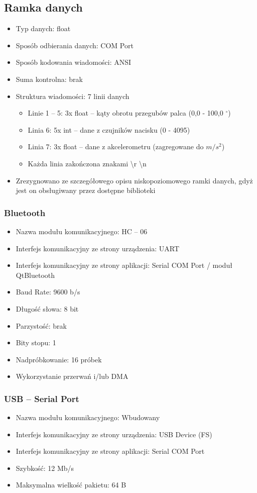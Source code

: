 \documentclass[10pt,a4paper]{article}
\begin{document}
\subsection{Ramka danych}
\begin{itemize}
\item Typ danych: float
\item Sposób odbierania danych: COM Port
\item Sposób kodowania wiadomości: ANSI
\item Suma kontrolna: brak
\item Struktura wiadomości: 7 linii danych
\begin{itemize}
\item Linie 1 -- 5: 3x float -- kąty obrotu przegubów palca (0,0 - 100,0 $^\circ$)
\item Linia 6: 5x int -- dane z czujników nacisku (0 - 4095)
\item Linia 7: 3x float -- dane z akcelerometru (zagregowane do $m/s^2$)
\item Każda linia zakończona znakami \textbackslash r \textbackslash n
\end{itemize}
\item Zrezygnowano ze szczegółowego opisu niskopoziomowego ramki danych, gdyż jest on obsługiwany przez dostępne biblioteki
\end{itemize}
\subsubsection{Bluetooth}
\begin{itemize}
\item Nazwa modułu komunikacyjnego: HC -- 06
\item Interfejs komunikacyjny ze strony urządzenia: UART
\item Interfejs komunikacyjny ze strony aplikacji: Serial COM Port / moduł QtBluetooth
\item Baud Rate: 9600 b/s
\item Długość słowa: 8 bit
\item Parzystość: brak
\item Bity stopu: 1
\item Nadpróbkowanie: 16 próbek
\item Wykorzystanie przerwań i/lub DMA
\end{itemize}
\subsubsection{USB -- Serial Port}
\begin{itemize}
\item Nazwa modułu komunikacyjnego: Wbudowany
\item Interfejs komunikacyjny ze strony urządzenia: USB Device (FS)
\item Interfejs komunikacyjny ze strony aplikacji: Serial COM Port
\item Szybkość: 12 Mb/s
\item Maksymalna wielkość pakietu: 64 B
\end{itemize}
\end{document}
